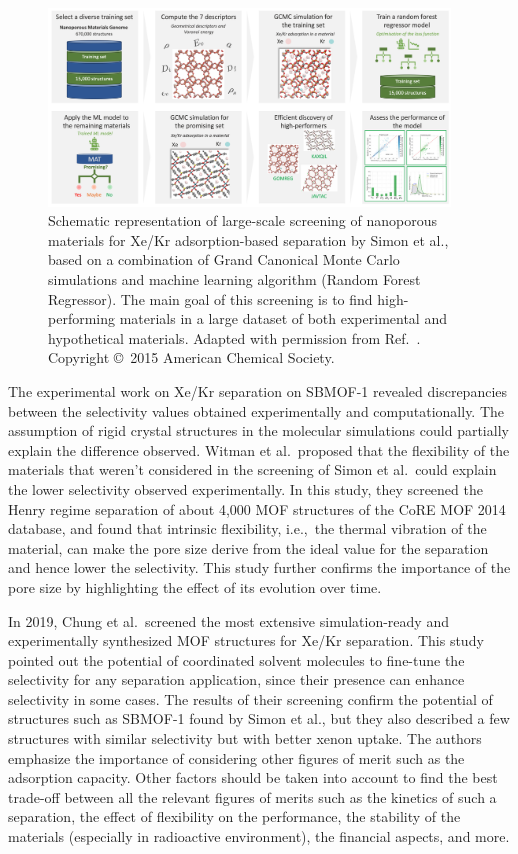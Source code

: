 \documentclass[main.tex]{subfiles}
\begin{document}
\begin{figure}[t]
  \centering
  \includegraphics[width=0.95\textwidth]{figures/1-screening/Simon.jpg}
  \caption{Schematic representation of large-scale screening of nanoporous materials for Xe/Kr adsorption-based separation by Simon et al.,\autocite{Simon_2015} based on a combination of Grand Canonical Monte Carlo simulations and machine learning algorithm (Random Forest Regressor). The main goal of this screening is to find high-performing materials in a large dataset of both experimental and hypothetical materials. 
  Adapted with permission from Ref.~\cite{Simon_2015}. Copyright \copyright\  2015 American Chemical Society.
  }\label{fgr:Simon}
\end{figure}

The experimental work on Xe/Kr separation on SBMOF-1 revealed discrepancies between the selectivity values obtained experimentally and computationally.\autocite{Banerjee_2016} {The assumption of rigid crystal structures in the molecular simulations could partially explain the difference observed.} Witman et al.\ proposed that the flexibility of the materials that weren't considered in the screening of Simon et al.\ could explain the lower selectivity observed experimentally.\autocite{Witman_2017} In this study, they screened the Henry regime separation of about 4,000 MOF structures of the CoRE MOF 2014 database\autocite{Chung_2014}, and found that intrinsic flexibility, i.e.,\ the thermal vibration of the material, can make the pore size derive from the ideal value for the separation and hence lower the selectivity. This study further confirms the importance of the pore size by highlighting the effect of its evolution over time.

In 2019, Chung et al.\ screened the most extensive simulation-ready and experimentally synthesized MOF structures for Xe/Kr separation.\autocite{Chung_2019} This study pointed out the potential of coordinated solvent molecules to fine-tune the selectivity for any separation application, since their presence can enhance selectivity in some cases. The results of their screening confirm the potential of structures such as SBMOF-1 found by Simon et al., but they also described a few structures with similar selectivity but with better xenon uptake. The authors emphasize the importance of considering other figures of merit such as the adsorption capacity. Other factors should be taken into account to find the best trade-off between all the relevant figures of merits such as the kinetics of such a separation, the effect of flexibility on the performance, the stability of the materials (especially in radioactive environment), the financial aspects, and more.
\end{document}
